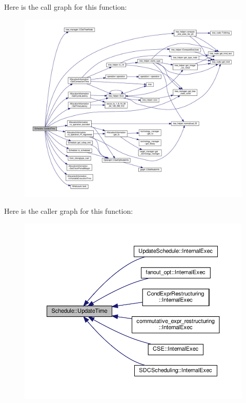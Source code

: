 Here is the call graph for this function\+:
\nopagebreak
\begin{figure}[H]
\begin{center}
\leavevmode
\includegraphics[width=350pt]{df/d61/classSchedule_a9eb19889586ce5d16aa8ed1ea356c2ab_cgraph}
\end{center}
\end{figure}
Here is the caller graph for this function\+:
\nopagebreak
\begin{figure}[H]
\begin{center}
\leavevmode
\includegraphics[width=350pt]{df/d61/classSchedule_a9eb19889586ce5d16aa8ed1ea356c2ab_icgraph}
\end{center}
\end{figure}
\mbox{\label{classSchedule_af0fedbcf697272b4f295bf0e7ef3a358}} 
